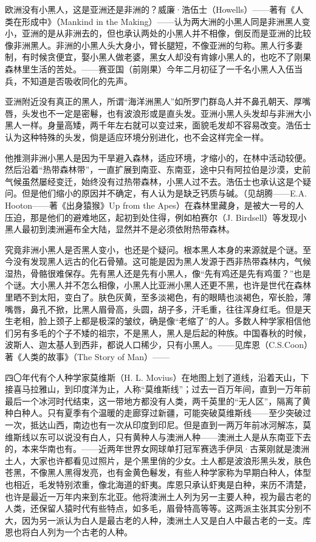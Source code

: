 \par 欧洲没有小黑人，这是亚洲还是非洲的？威廉·浩伍士（Howells）——著有《人类在形成中》（Mankind in the Making）——认为两大洲的小黑人同是非洲黑人变小，亚洲的是从非洲去的，但也承认两处的小黑人并不相像，倒反而是亚洲的比较像非洲黑人。非洲的小黑人头大身小，臂长腿短，不像亚洲的匀称。黑人行多妻制，有时候贪便宜，娶小黑人做老婆，黑女人却没有肯嫁小黑人的，也吃不了刚果森林里生活的苦处。——赛亚国（前刚果）今年二月初征了一千名小黑人入伍当兵，不知道是否吸收同化的先声。
\par 亚洲附近没有真正的黑人，所谓“海洋洲黑人”如所罗门群岛人并不鼻孔朝天、厚嘴唇，头发也不一定是密鬈，也有波浪形或是直头发。亚洲小黑人头发却与非洲大小黑人一样。身量高矮，两千年左右就可以变过来，面貌毛发却不容易改变。浩伍士认为这种特殊的头发，倘是适应环境分别进化，也不会这样完全一样。
\par 他推测非洲小黑人是因为干旱避入森林，适应环境，才缩小的，在林中活动较便。然后沿着“热带森林带”，一直扩展到南亚、东南亚，途中只有阿拉伯是沙漠，史前气候虽然屡经变迁，始终没有过热带森林，小黑人过不去。浩伍士也承认这是个疑问。但是他们缩小的原因并不确定，有人认为是缺乏钙质与碱。（见胡腾——E.A. Hooton——著《出身猿猴》Up from the Apes）在森林里藏身，是被大一号的人压迫，那是他们的避难地区，起初到处住得，例如柏赛尔（J. Birdsell）等发现小黑人最初到澳洲遍布全大陆，显然并不是必须依附热带森林。
\par 究竟非洲小黑人是否黑人变小，也还是个疑问。根本黑人本身的来源就是个谜。至今没有发现黑人远古的化石骨殖。这可能是因为黑人发源于西非热带森林内，气候湿热，骨骼很难保存。先有黑人还是先有小黑人，像“先有鸡还是先有鸡蛋？”也是个谜。大小黑人并不怎么相像，小黑人比亚洲小黑人还更不黑，也许是世代在森林里晒不到太阳，变白了。肤色灰黄，至多淡褐色，有的眼睛也淡褐色，窄长脸，薄嘴唇，鼻孔不掀，比黑人眉骨高，头圆，胡子多，汗毛重，往往浑身红毛。但是天生老相，脸上颈子上都是极深的皱纹，确是像“老缩了”的人。多数人种学家相信他们另有多毛的个子不矮的祖宗，不是黑人，黑人是后起的种族。中国春秋的时候，波斯人、迦太基人到西非，都说人口稀少，只有小黑人。——见库恩（C.S.Coon）著《人类的故事》（The Story of Man）——
\par 四〇年代有个人种学家莫维斯（H. L. Movius）在地图上划了道线，沿着天山，下接喜马拉雅山，到印度洋为止，人称“莫维斯线”；过去一百万年间，直到一万年前最后一个冰河时代结束，这一带地方都没有人类，两千英里的“无人区”，隔离了黄种白种人。只有夏季有个温暖的走廊穿过新疆，可能突破莫维斯线——至少突破过一次，抵达山西，南边也有一次从印度到印尼。但是直到一两万年前冰河解冻，莫维斯线以东可以说没有白人，只有黄种人与澳洲人种——澳洲土人是从东南亚下去的，本来华南也有。——近两年世界女网球单打冠军赛选手伊凤·古莱刚就是澳洲土人，大家也许都看见过照片，是个黑里俏的少女。土人都是波浪形黑头发，肤色苍黑，不像黑人黑得发亮，也有金黄色鬈发，有些人种学家称为早期白种人，体型也相近，毛发特别浓重，像北海道的虾夷。库恩只承认虾夷是白种，来历不清楚，也许是最近一万年内来到东北亚。他将澳洲土人列为另一主要人种，视为最古老的人类，还保留人猿时代有些特点，如多毛，眉骨特高等等。这两派主张其实分别不大，因为另一派认为白人是最古老的人种，澳洲土人又是白人中最古老的一支。库恩也将白人列为一个古老的人种。
